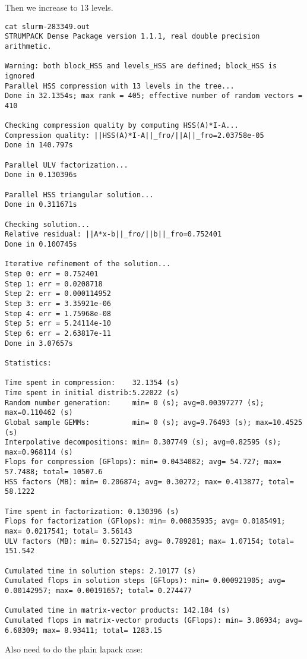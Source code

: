 \documentclass{acmsmall}
\begin{document}
Then we increase to 13 levels.
\begin{verbatim}
cat slurm-283349.out
STRUMPACK Dense Package version 1.1.1, real double precision arithmetic.

Warning: both block_HSS and levels_HSS are defined; block_HSS is ignored
Parallel HSS compression with 13 levels in the tree...
Done in 32.1354s; max rank = 405; effective number of random vectors = 410

Checking compression quality by computing HSS(A)*I-A...
Compression quality: ||HSS(A)*I-A||_fro/||A||_fro=2.03758e-05
Done in 140.797s

Parallel ULV factorization...
Done in 0.130396s

Parallel HSS triangular solution...
Done in 0.311671s

Checking solution...
Relative residual: ||A*x-b||_fro/||b||_fro=0.752401
Done in 0.100745s

Iterative refinement of the solution...
Step 0: err = 0.752401
Step 1: err = 0.0208718
Step 2: err = 0.000114952
Step 3: err = 3.35921e-06
Step 4: err = 1.75968e-08
Step 5: err = 5.24114e-10
Step 6: err = 2.63817e-11
Done in 3.07657s

Statistics: 

Time spent in compression:    32.1354 (s)
Time spent in initial distrib:5.22022 (s)
Random number generation:     min= 0 (s); avg=0.00397277 (s); max=0.110462 (s)
Global sample GEMMs:          min= 0 (s); avg=9.76493 (s); max=10.4525 (s)
Interpolative decompositions: min= 0.307749 (s); avg=0.82595 (s); max=0.968114 (s)
Flops for compression (GFlops): min= 0.0434082; avg= 54.727; max= 57.7488; total= 10507.6
HSS factors (MB): min= 0.206874; avg= 0.30272; max= 0.413877; total= 58.1222

Time spent in factorization: 0.130396 (s)
Flops for factorization (GFlops): min= 0.00835935; avg= 0.0185491; max= 0.0217541; total= 3.56143
ULV factors (MB): min= 0.527154; avg= 0.789281; max= 1.07154; total= 151.542

Cumulated time in solution steps: 2.10177 (s)
Cumulated flops in solution steps (GFlops): min= 0.000921905; avg= 0.00142957; max= 0.00191657; total= 0.274477

Cumulated time in matrix-vector products: 142.184 (s)
Cumulated flops in matrix-vector products (GFlops): min= 3.86934; avg= 6.68309; max= 8.93411; total= 1283.15
\end{verbatim}

Also need to do the plain lapack case:
\end{document}
